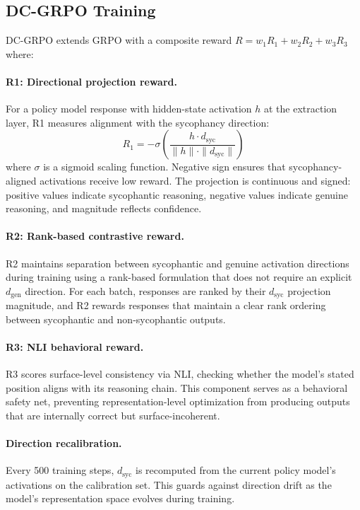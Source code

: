 \documentclass[11pt,a4paper]{article}
\newcommand{\dsyc}{d_{\text{syc}}}
\newcommand{\dgen}{d_{\text{gen}}}
\begin{document}
\subsection{DC-GRPO Training}

DC-GRPO extends GRPO with a composite reward $R = w_1 R_1 + w_2 R_2 + w_3 R_3$ where:

\paragraph{R1: Directional projection reward.}
For a policy model response with hidden-state activation $h$ at the extraction layer, R1 measures alignment with the sycophancy direction:
\begin{equation}
    R_1 = -\sigma\left(\frac{h \cdot \dsyc}{\|h\| \cdot \|\dsyc\|}\right)
\end{equation}
where $\sigma$ is a sigmoid scaling function. Negative sign ensures that sycophancy-aligned activations receive low reward. The projection is continuous and signed: positive values indicate sycophantic reasoning, negative values indicate genuine reasoning, and magnitude reflects confidence.

\paragraph{R2: Rank-based contrastive reward.}
R2 maintains separation between sycophantic and genuine activation directions during training using a rank-based formulation that does not require an explicit $\dgen$ direction. For each batch, responses are ranked by their $\dsyc$ projection magnitude, and R2 rewards responses that maintain a clear rank ordering between sycophantic and non-sycophantic outputs.

\paragraph{R3: NLI behavioral reward.}
R3 scores surface-level consistency via NLI, checking whether the model's stated position aligns with its reasoning chain. This component serves as a behavioral safety net, preventing representation-level optimization from producing outputs that are internally correct but surface-incoherent.

\paragraph{Direction recalibration.}
Every 500 training steps, $\dsyc$ is recomputed from the current policy model's activations on the calibration set. This guards against direction drift as the model's representation space evolves during training.
\end{document}

